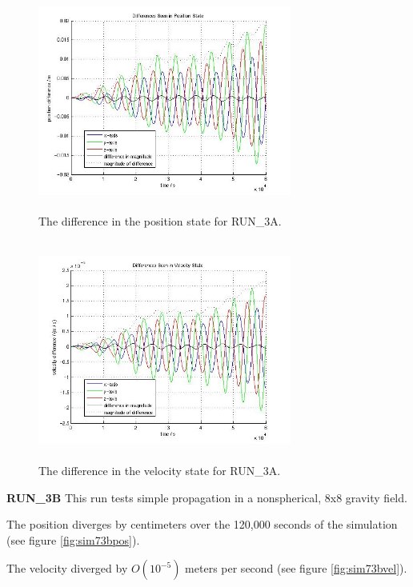 \begin{description}
\begin{figure}[htp]
\begin{center}
\includegraphics[width=3.2736in,height=2.85in]{figures/run3apos.jpg}
\caption{The difference in the position state for RUN\_3A.}
\label{fig:sim73apos}
\end{center}
\end{figure}

\begin{figure}[htp]
\begin{center}
\includegraphics[width=3.2736in,height=2.85in]{figures/run3avel.jpg}
\caption{The difference in the velocity state for RUN\_3A.}
\label{fig:sim73avel}
\end{center}
\end{figure}



\clearpage
{\bf RUN\_3B}
This run tests simple propagation in a nonspherical, 8x8 gravity field. 

The position diverges by centimeters over the 120,000 seconds of the simulation 
(see figure \ref{fig:sim73bpos}).

The velocity diverged by $O(10^{-5})$ meters per second (see figure 
\ref{fig:sim73bvel}).



\end{description}
